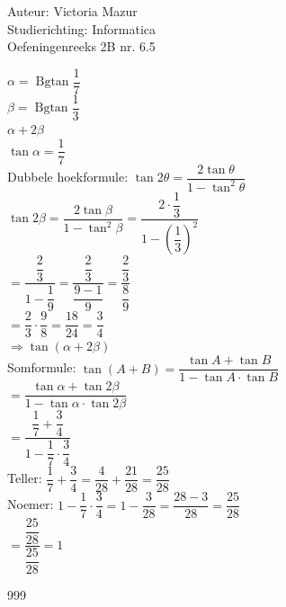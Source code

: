 \documentclass[a4paper]{article}
\begin{document}
  
\noindent \large Auteur: Victoria Mazur \\
\noindent \large Studierichting: Informatica\\
\noindent \large Oefeningenreeks 2B nr. 6.5\\

\medskip

\normalsize

$\alpha = \operatorname{Bgtan} \dfrac{1}{7}$ \\

$\beta = \operatorname{Bgtan} \dfrac{1}{3}$ \\

$\alpha + 2\beta$ \\

$\tan \alpha = \dfrac{1}{7}$ \\

Dubbele hoekformule: $\tan 2\theta = \dfrac{2 \tan \theta}{1 - \tan^2 \theta}$ \\

$\tan 2\beta = \dfrac{2 \tan \beta}{1 - \tan^2 \beta} = \dfrac{2 \cdot \dfrac{1}{3}}{1 - \left(\dfrac{1}{3}\right)^2}$ \\

$= \dfrac{\dfrac{2}{3}}{1 - \dfrac{1}{9}} = \dfrac{\dfrac{2}{3}}{\dfrac{9-1}{9}} = \dfrac{\dfrac{2}{3}}{\dfrac{8}{9}}$ \\

$= \dfrac{2}{3} \cdot \dfrac{9}{8} = \dfrac{18}{24} = \dfrac{3}{4}$ \\

$\Rightarrow \tan(\alpha + 2\beta)$ \\

Somformule: $\tan(A + B) = \dfrac{\tan A + \tan B}{1 - \tan A \cdot \tan B}$ \\

$= \dfrac{\tan \alpha + \tan 2\beta}{1 - \tan \alpha \cdot \tan 2\beta}$ \\

$= \dfrac{\dfrac{1}{7} + \dfrac{3}{4}}{1 - \dfrac{1}{7} \cdot \dfrac{3}{4}}$ \\

Teller: $\dfrac{1}{7} + \dfrac{3}{4} = \dfrac{4}{28} + \dfrac{21}{28} = \dfrac{25}{28}$ \\

Noemer: $1 - \dfrac{1}{7} \cdot \dfrac{3}{4} = 1 - \dfrac{3}{28} = \dfrac{28-3}{28} = \dfrac{25}{28}$ \\

$= \dfrac{\dfrac{25}{28}}{\dfrac{25}{28}} = 1$ \\

\begin{thebibliography}{999}
\end{thebibliography}
\end{document}
